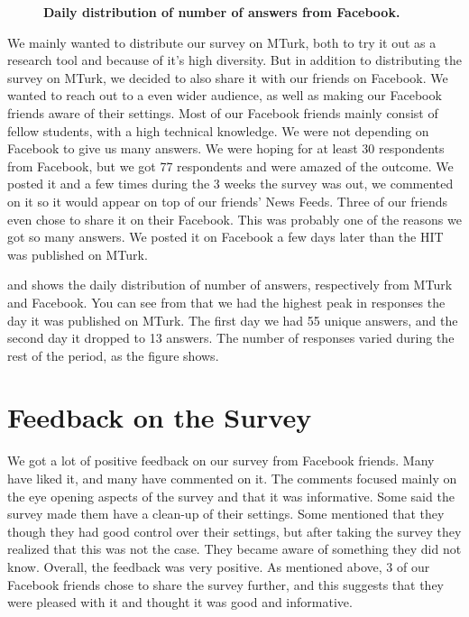 \begin{figure}[t]
\centering
{}
\caption[Daily distribution of number of answers from Facebook]{\textbf{Daily distribution of number of answers from Facebook.}} 
\label{fig:answersfacebook}
\end{figure}

We mainly wanted to distribute our survey on MTurk, both to try it out as a research tool and because of it's high diversity. But in addition to distributing the survey on MTurk, we decided to also share it with our friends on Facebook. We wanted to reach out to a even wider audience, as well as making our Facebook  friends aware of their settings. Most of our Facebook friends mainly consist of fellow students, with a high technical knowledge. We were not depending on Facebook to give us many answers. We were hoping for at least 30 respondents from Facebook, but we got 77 respondents and were amazed of the outcome. We posted it and a few times during the 3 weeks the survey was out, we commented on it so it would appear on top of our friends' News Feeds. Three of our friends even chose to share it on their Facebook. This was probably one of the reasons we got so many answers. We posted it on Facebook a few days later than the HIT was published on MTurk.  

 and  shows the daily distribution of number of answers, respectively from MTurk and Facebook. You can see from  that we had the highest peak in responses the day it was published on MTurk. The first day we had 55 unique answers, and the second day it dropped to 13 answers. The number of responses varied during the rest of the period, as the figure shows. 

\section{Feedback on the Survey}
We got a lot of positive feedback on our survey from Facebook friends. Many have liked it, and many have commented on it. The comments focused mainly on the eye opening aspects of the survey and that it was informative. Some said the survey made them have a clean-up of their settings. Some mentioned that they though they had good control over their settings, but after taking the survey they realized that this was not the case. They became aware of something they did not know. Overall, the feedback was very positive. As mentioned above, 3 of our Facebook friends chose to share the survey further, and this suggests that they were pleased with it and thought it was good and informative. 

